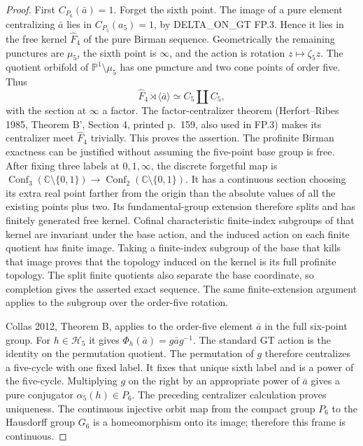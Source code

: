 \begin{proof}
First $C_{P_6}(\bar a)=1$.  Forget the sixth point.  The image of a
pure element centralizing $\bar a$ lies in $C_{P_5}(a_5)=1$,
by DELTA\_ON\_GT FP.3.  Hence it lies in the free kernel
$\widehat F_4$ of the pure Birman sequence.  Geometrically the
remaining punctures are $\mu_5$, the sixth point is $\infty$, and
the action is rotation $z\mapsto\zeta_5 z$.  The quotient orbifold
of $\mathbb P^1\setminus\mu_5$ has one puncture and two cone
points of order five.  Thus
\[
 \widehat F_4\rtimes\langle\bar a\rangle
       \simeq C_5\amalg C_5,
\]
with the section at $\infty$ a factor.  The factor-centralizer
theorem (Herfort--Ribes 1985, Theorem B', Section 4, printed
p.~159, also used in FP.3) makes its centralizer meet
$\widehat F_4$ trivially.  This proves the assertion.  The
profinite Birman exactness can be justified without assuming
the five-point base group is free. After fixing three labels
at $0,1,\infty$, the discrete forgetful map is
$\operatorname{Conf}_3(\mathbb C\setminus\{0,1\})\to
\operatorname{Conf}_2(\mathbb C\setminus\{0,1\})$.
It has a continuous section choosing its extra real point
farther from the origin than the absolute values of all the
existing points plus two. Its fundamental-group extension
therefore splits and has finitely generated free kernel.
Cofinal characteristic finite-index subgroups of that kernel
are invariant under the base action, and the induced action
on each finite quotient has finite image. Taking a finite-index
subgroup of the base that kills that image proves that the
topology induced on the kernel is its full profinite topology.
The split finite quotients also separate the base coordinate,
so completion gives the asserted exact sequence. The same
finite-extension argument applies to the subgroup over the
order-five rotation.

Collas 2012, Theorem B, applies to the order-five element $\bar a$
in the full six-point group.  For $h\in\mathcal H_5$ it gives
$\Phi_h(\bar a)=g\bar a g^{-1}$.  The standard GT action is the
identity on the permutation quotient.  The permutation of $g$
therefore centralizes a five-cycle with one fixed label.  It
fixes that unique sixth label and is a power of the five-cycle.
Multiplying $g$ on the right by an appropriate power of $\bar a$
gives a pure conjugator $\alpha_5(h)\in P_6$.
The preceding centralizer calculation proves uniqueness.
The continuous injective orbit map from the compact group $P_6$
to the Hausdorff group $G_6$ is a homeomorphism onto its image;
therefore this frame is continuous.


\end{proof}
